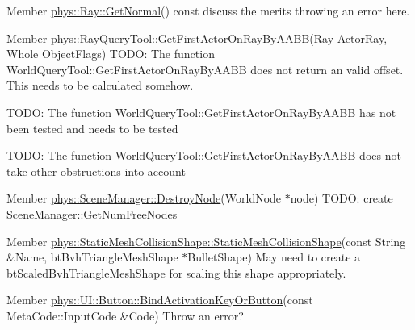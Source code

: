 \label{todo__todo000018}
\hypertarget{todo__todo000018}{}
 
\begin{DoxyDescription}
\item[Member \hyperlink{classphys_1_1Ray_a7445c25acb6ce865ef85e7ada829ccba}{phys::Ray::GetNormal}() const  ]discuss the merits throwing an error here. 
\end{DoxyDescription}

\label{todo__todo000019}
\hypertarget{todo__todo000019}{}
 
\begin{DoxyDescription}
\item[Member \hyperlink{classphys_1_1RayQueryTool_af4bba2ed8f201d4b0e9a05728d8bd1b6}{phys::RayQueryTool::GetFirstActorOnRayByAABB}(Ray ActorRay, Whole ObjectFlags) ]TODO: The function WorldQueryTool::GetFirstActorOnRayByAABB does not return an valid offset. This needs to be calculated somehow. 

TODO: The function WorldQueryTool::GetFirstActorOnRayByAABB has not been tested and needs to be tested 

TODO: The function WorldQueryTool::GetFirstActorOnRayByAABB does not take other obstructions into account 
\end{DoxyDescription}

\label{todo__todo000022}
\hypertarget{todo__todo000022}{}
 
\begin{DoxyDescription}
\item[Member \hyperlink{classphys_1_1SceneManager_a5a2d68ab38308f9c6ac4b659cae36dee}{phys::SceneManager::DestroyNode}(WorldNode $\ast$node) ]TODO: create SceneManager::GetNumFreeNodes 
\end{DoxyDescription}

\label{todo__todo000003}
\hypertarget{todo__todo000003}{}
 
\begin{DoxyDescription}
\item[Member \hyperlink{classphys_1_1StaticMeshCollisionShape_a1de8ba7849a90368dd601d10917c1a0c}{phys::StaticMeshCollisionShape::StaticMeshCollisionShape}(const String \&Name, btBvhTriangleMeshShape $\ast$BulletShape) ]May need to create a btScaledBvhTriangleMeshShape for scaling this shape appropriately. 
\end{DoxyDescription}

\label{todo__todo000023}
\hypertarget{todo__todo000023}{}
 
\begin{DoxyDescription}
\item[Member \hyperlink{classphys_1_1UI_1_1Button_a3b51fa981fdf869240bff082bafb56a9}{phys::UI::Button::BindActivationKeyOrButton}(const MetaCode::InputCode \&Code) ]Throw an error? 
\end{DoxyDescription}

